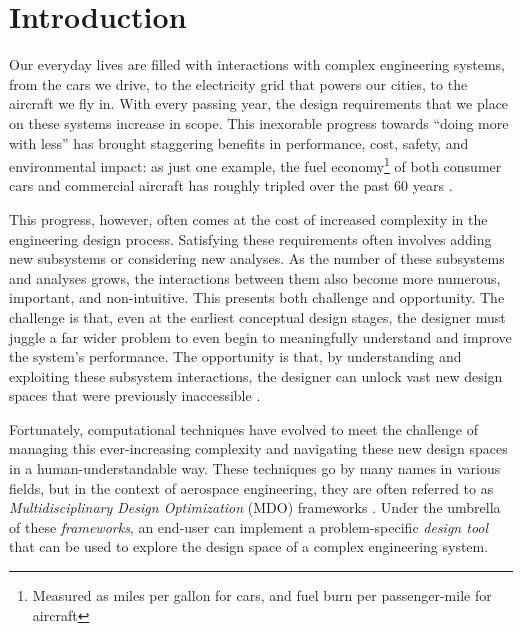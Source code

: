 \chapter{Introduction}
\label{chap:intro}


Our everyday lives are filled with interactions with complex engineering systems, from the cars we drive, to the electricity grid that powers our cities, to the aircraft we fly in. With every passing year, the design requirements that we place on these systems increase in scope. This inexorable progress towards ``doing more with less'' has brought staggering benefits in performance, cost, safety, and environmental impact: as just one example, the fuel economy\footnote{Measured as miles per gallon for cars, and fuel burn per passenger-mile for aircraft} of both consumer cars and commercial aircraft has roughly tripled over the past 60 years \cite{EPA_Automotive_Trends_2023, drela_tedx}.

This progress, however, often comes at the cost of increased complexity in the engineering design process. Satisfying these requirements often involves adding new subsystems or considering new analyses. As the number of these subsystems and analyses grows, the interactions between them also become more numerous, important, and non-intuitive. This presents both challenge and opportunity. The challenge is that, even at the earliest conceptual design stages, the designer must juggle a far wider problem to even begin to meaningfully understand and improve the system's performance. The opportunity is that, by understanding and exploiting these subsystem interactions, the designer can unlock vast new design spaces that were previously inaccessible \cite{drela_design_2011}.

Fortunately, computational techniques have evolved to meet the challenge of managing this ever-increasing complexity and navigating these new design spaces in a human-understandable way. These techniques go by many names in various fields, but in the context of aerospace engineering, they are often referred to as \emph{Multidisciplinary Design Optimization} (MDO) frameworks \cite{martins_multidisciplinary_2013}. Under the umbrella of these \emph{frameworks}, an end-user can implement a problem-specific \emph{design tool} that can be used to explore the design space of a complex engineering system.

